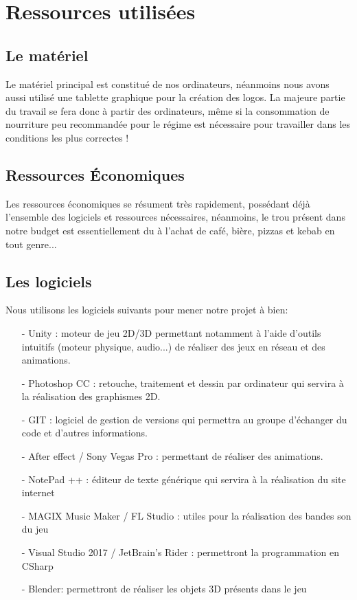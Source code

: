 \documentclass[12pt,a4paper]{article}
\begin{document}
\newpage

\section{Ressources utilisées}
\subsection{Le matériel}
Le matériel principal est constitué de nos ordinateurs, néanmoins nous avons aussi utilisé une tablette graphique
pour la création des logos.
La majeure partie du travail se fera donc à partir des ordinateurs, même si la consommation de nourriture
peu recommandée pour le régime est nécessaire pour travailler dans les conditions les plus correctes !

\subsection{Ressources Économiques}
Les ressources économiques se résument très rapidement, possédant déjà l'ensemble des logiciels et ressources nécessaires, néanmoins, le trou présent dans notre budget est essentiellement du à l'achat de café, bière, pizzas et kebab en tout genre...

\newpage

\subsection{Les logiciels}
Nous utilisons les logiciels suivants pour mener notre projet à bien:
\begin{itemize}
\item[-] Unity : moteur de jeu 2D/3D permettant notamment à l'aide d'outils
intuitifs (moteur physique, audio...) de réaliser des jeux en réseau et
des animations.
\item[-] Photoshop CC : retouche, traitement et dessin par
ordinateur qui servira à la réalisation des graphismes 2D.
\item[-] GIT : logiciel de gestion de versions qui permettra au groupe d'échanger du code et d’autres informations.
\item[-] After effect / Sony Vegas Pro : permettant de réaliser des animations.
\item[-] NotePad ++ : éditeur de texte générique qui servira à la réalisation
du site internet
\item[-] MAGIX Music Maker / FL Studio : utiles pour la
réalisation des bandes son du jeu
\item[-] Visual Studio 2017 / JetBrain's Rider : permettront la programmation en CSharp
\item[-] Blender: permettront de réaliser les objets 3D présents dans le jeu
\end{itemize}
\end{document}
